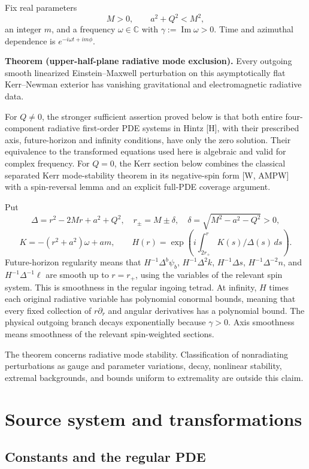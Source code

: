\documentclass[
  10pt,
  a4paper,
]{article}
\begin{document}
Fix real parameters \[
 M>0,\qquad a^2+Q^2<M^2,
\] an integer \(m\), and a frequency \(\omega\in\mathbb C\) with
\(\gamma:=\operatorname{Im}\omega>0\). Time and azimuthal dependence is
\(e^{-i\omega t+im\phi}\).

\textbf{Theorem (upper-half-plane radiative mode exclusion).} Every
outgoing smooth linearized Einstein--Maxwell perturbation on this
asymptotically flat Kerr--Newman exterior has vanishing gravitational
and electromagnetic radiative data.

For \(Q\ne0\), the stronger sufficient assertion proved below is that
both entire four-component radiative first-order PDE systems in Hintz
{[}H{]}, with their prescribed axis, future-horizon and infinity
conditions, have only the zero solution. Their equivalence to the
transformed equations used here is algebraic and valid for complex
frequency. For \(Q=0\), the Kerr section below combines the classical
separated Kerr mode-stability theorem in its negative-spin form {[}W,
AMPW{]} with a spin-reversal lemma and an explicit full-PDE coverage
argument.

Put \[
 \Delta=r^2-2Mr+a^2+Q^2,\quad r_\pm=M\pm\delta,\quad
 \delta=\sqrt{M^2-a^2-Q^2}>0,
\] \[
 K=-(r^2+a^2)\omega+am,\qquad
 H(r)=\exp\left(i\int_{2r_+}^r K(s)/\Delta(s)\,ds\right).
\] Future-horizon regularity means that \(H^{-1}\Delta^b\psi_b\),
\(H^{-1}\Delta^2k\), \(H^{-1}\Delta s\), \(H^{-1}\Delta^{-2}n\), and
\(H^{-1}\Delta^{-1}\ell\) are smooth up to \(r=r_+\), using the
variables of the relevant spin system. This is smoothness in the regular
ingoing tetrad. At infinity, \(H\) times each original radiative
variable has polynomial conormal bounds, meaning that every fixed
collection of \(r\partial_r\) and angular derivatives has a polynomial
bound. The physical outgoing branch decays exponentially because
\(\gamma>0\). Axis smoothness means smoothness of the relevant
spin-weighted sections.

The theorem concerns radiative mode stability. Classification of
nonradiating perturbations as gauge and parameter variations, decay,
nonlinear stability, extremal backgrounds, and bounds uniform to
extremality are outside this claim.

\section{Source system and
transformations}\label{source-system-and-transformations}

\subsection{Constants and the regular
PDE}\label{constants-and-the-regular-pde}
\end{document}
